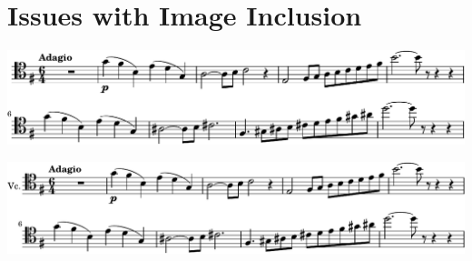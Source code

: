 \documentclass{scrartcl}
\begin{document}
\section{Issues with Image Inclusion}

\Blindtext[1]

\includegraphics[width=\textwidth]{media/cygne-solo}

\Blindtext[1]

\hspace*{-1.25em}\includegraphics[width=\textwidth]{media/cygne-solo-with-name}

\Blindtext[1]
\end{document}

